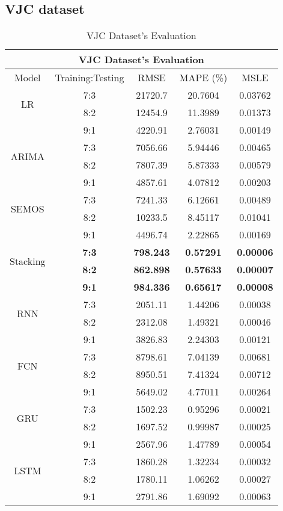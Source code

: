\documentclass{ieeeojies}
\begin{document}
\subsection{VJC dataset} 
\begin{table}[H]
    \centering
    \begin{tabular}{|c|c|c|c|c|}
         \hline
         \multicolumn{5}{|c|}{\textbf{VJC Dataset's Evaluation}}\\
         \hline
         \centering Model & Training:Testing & RMSE & MAPE (\%) & MSLE\\
         \hline
            \multirow{2}{*}{LR} & 7:3 & 21720.7 & 20.7604 & 0.03762 \\ & 8:2 & 12454.9 & 11.3989 & 0.01373 \\ & 9:1 & 4220.91 & 2.76031 & 0.00149 \\
            \hline
            \multirow{2}{*}{ARIMA} & 7:3 & 7056.66 & 5.94446 & 0.00465 \\ & 8:2 & 7807.39 & 5.87333 & 0.00579 \\ & 9:1 & 4857.61 & 4.07812 & 0.00203 \\
            \hline
            \multirow{2}{*}{SEMOS} & 7:3 & 7241.33 & 6.12661 & 0.00489 \\ & 8:2 & 10233.5 & 8.45117 & 0.01041 \\ & 9:1 & 4496.74 & 2.22865 & 0.00169 \\
            \hline
            \multirow{2}{*}{Stacking} & \textbf{7:3} & \textbf{798.243} & \textbf{0.57291} & \textbf{0.00006} \\ & \textbf{8:2} & \textbf{862.898} & \textbf{0.57633} & \textbf{0.00007} \\ & \textbf{9:1} & \textbf{984.336} & \textbf{0.65617} & \textbf{0.00008} \\
            \hline
            \multirow{2}{*}{RNN} & 7:3 & 2051.11 & 1.44206 & 0.00038 \\ & 8:2 & 2312.08 & 1.49321 & 0.00046 \\ & 9:1 & 3826.83 & 2.24303 & 0.00121 \\
            \hline
            \multirow{2}{*}{FCN} & 7:3 & 8798.61 & 7.04139 & 0.00681 \\ & 8:2 & 8950.51 & 7.41324 & 0.00712 \\ & 9:1 & 5649.02 & 4.77011 & 0.00264 \\
            \hline
            \multirow{2}{*}{GRU} & 7:3 & 1502.23 & 0.95296 & 0.00021 \\ & 8:2 & 1697.52 & 0.99987 & 0.00025 \\ & 9:1 & 2567.96 & 1.47789 & 0.00054 \\
            \hline
            \multirow{2}{*}{LSTM} & 7:3 & 1860.28 & 1.32234 & 0.00032 \\ & 8:2 & 1780.11 & 1.06262 & 0.00027 \\ & 9:1 & 2791.86 & 1.69092 & 0.00063 \\
            \hline
            
    \end{tabular}
    \caption{VJC Dataset's Evaluation}
    \label{vcbresult}
\end{table}
\end{document}
